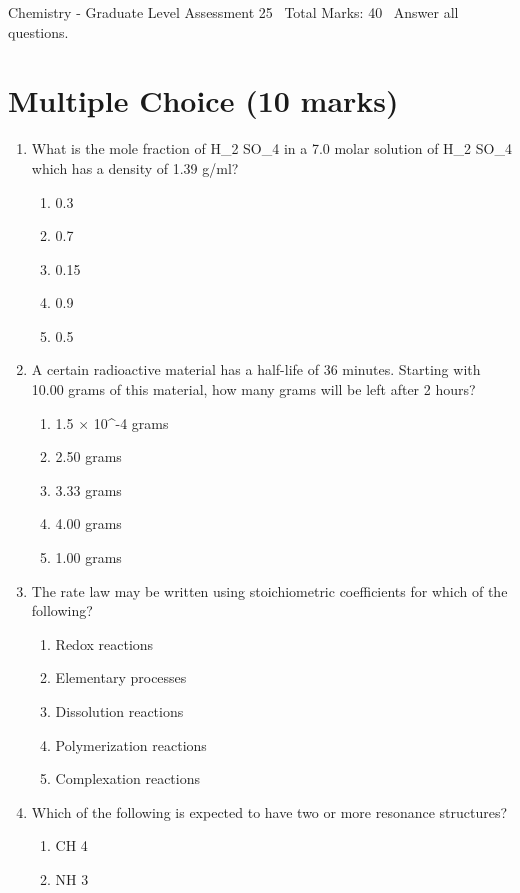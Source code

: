 \documentclass[12pt]{article}
\begin{document}
\begin{center}
Chemistry - Graduate Level Assessment 25 \
Total Marks: 40 \
Answer all questions.
\end{center}

\section*{Multiple Choice (10 marks)}
\begin{enumerate}[label=\arabic*.]
\item What is the mole fraction of H\_2 SO\_4 in a 7.0 molar solution of H\_2 SO\_4 which has a density of 1.39 g/ml?
\begin{enumerate}[label=(\alph*)]
    \item 0.3
    \item 0.7
    \item 0.15
    \item 0.9
    \item 0.5
\end{enumerate}
\item A certain radioactive material has a half-life of 36 minutes. Starting with 10.00 grams of this material, how many grams will be left after 2 hours?
\begin{enumerate}[label=(\alph*)]
    \item 1.5 \ensuremath{\times} 10^-4 grams
    \item 2.50 grams
    \item 3.33 grams
    \item 4.00 grams
    \item 1.00 grams
\end{enumerate}
\item The rate law may be written using stoichiometric coefficients for which of the following?
\begin{enumerate}[label=(\alph*)]
    \item Redox reactions
    \item Elementary processes
    \item Dissolution reactions
    \item Polymerization reactions
    \item Complexation reactions
\end{enumerate}
\item Which of the following is expected to have two or more resonance structures?
\begin{enumerate}[label=(\alph*)]
    \item CH 4
    \item NH 3

\end{enumerate}
\end{enumerate}
\end{document}
